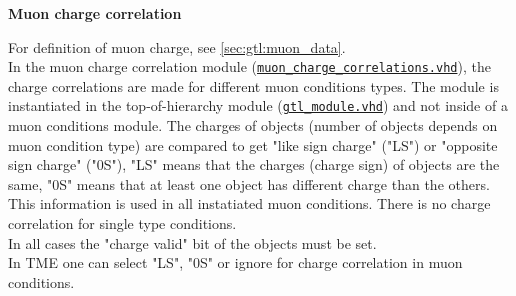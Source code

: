 
\textbf{Muon charge correlation}
\label{sec:gtl:muon_charge_correlation_module}

For definition of muon charge, see \ref{sec:gtl:muon_data}.\\
In the muon charge correlation module (\href{\gitbranch/firmware/hdl/gt_mp7_core/gtl_fdl_wrapper/gtl/muon_charge_correlations.vhd}{\texttt{\textquotesingle muon\_charge\_correlations.vhd\textquotesingle }}), the charge correlations are made for different muon conditions types. The module is instantiated in the top-of-hierarchy module (\href{\gitbranch/firmware/hdl/payload/gtl\_module\_tpl.vhd}{\texttt{\textquotesingle gtl\_module.vhd\textquotesingle }})
and not inside of a muon conditions module.
The charges of objects (number of objects depends on muon condition type) are compared to get "like sign charge" ("LS") or "opposite sign charge" ("0S"), "LS" means that the charges (charge sign)
of objects are the same, "0S" means that at least one object has different charge than the others. This information is used in all instatiated muon conditions.
There is no charge correlation for single type conditions.\\
In all cases the "charge valid" bit of the objects must be set.\\
In TME one can select "LS", "0S" or ignore for charge correlation in muon conditions.\\



